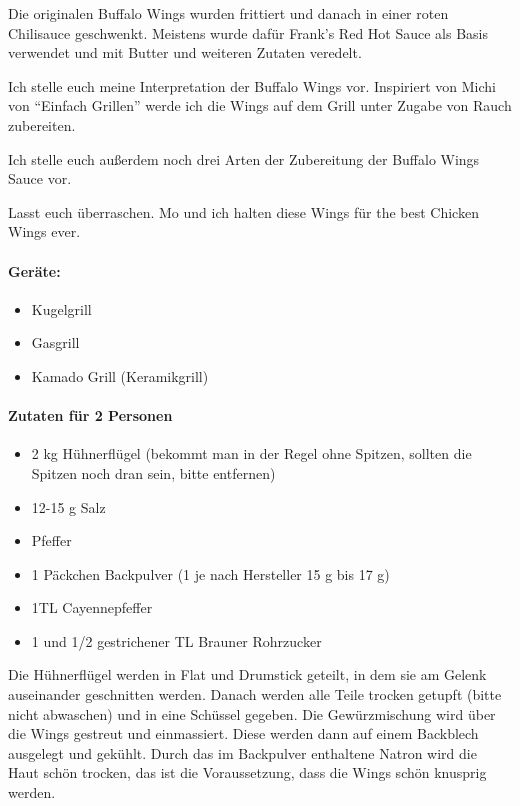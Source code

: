 Die originalen Buffalo Wings wurden frittiert und danach in einer roten Chilisauce geschwenkt. Meistens wurde dafür Frank's Red Hot 
Sauce als Basis verwendet und mit Butter und weiteren Zutaten veredelt.

Ich stelle euch meine Interpretation der Buffalo Wings vor. 
Inspiriert von Michi von "`Einfach Grillen"'  werde ich die Wings auf dem Grill unter Zugabe von Rauch zubereiten. 

Ich stelle euch außerdem noch drei Arten der Zubereitung der Buffalo Wings Sauce vor.

Lasst euch überraschen. Mo und ich halten diese Wings für the best Chicken Wings ever.


\paragraph{Geräte:}

\begin{itemize}[noitemsep]
	\item Kugelgrill
	\item Gasgrill
	\item Kamado Grill (Keramikgrill)
\end{itemize}

\paragraph{Zutaten für 2 Personen}

\begin{itemize}[noitemsep]
	\item 2 kg Hühnerflügel (bekommt man in der Regel ohne Spitzen, sollten die Spitzen noch dran sein, bitte entfernen)
	\item 12-15 g Salz
	\item Pfeffer
	\item 1 Päckchen Backpulver (1 je nach Hersteller 15 g bis 17 g)
	\item 1TL Cayennepfeffer
	\item 1 und 1/2 gestrichener TL Brauner Rohrzucker
\end{itemize}

Die Hühnerflügel werden in Flat und Drumstick geteilt, in dem sie am Gelenk auseinander geschnitten werden. Danach werden alle Teile 
trocken getupft (bitte nicht abwaschen) und in eine Schüssel gegeben. Die Gewürzmischung wird über die Wings gestreut und 
einmassiert. Diese werden dann auf einem Backblech ausgelegt und gekühlt. 
Durch das im Backpulver enthaltene Natron wird die Haut schön trocken, das ist die Voraussetzung, dass die Wings schön 
knusprig werden.

